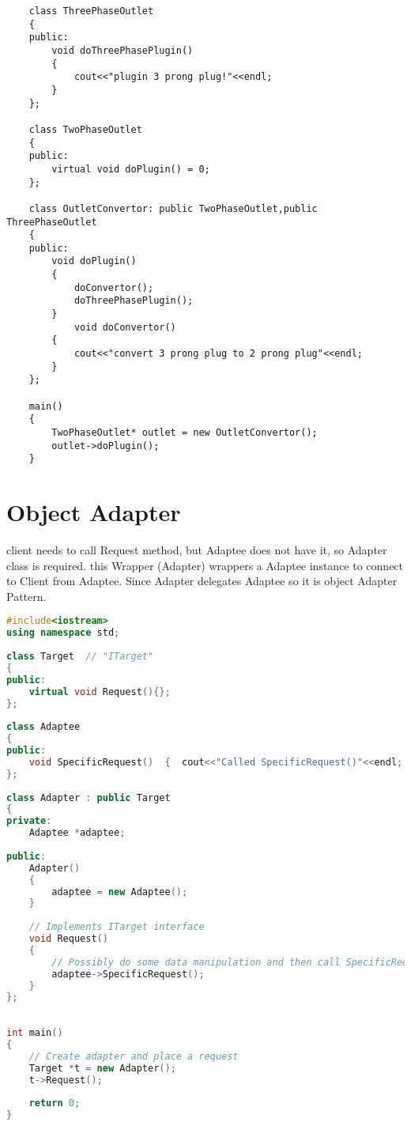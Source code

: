 \documentclass{book}
\begin{document}
\begin{lstlisting}
    class ThreePhaseOutlet  
    {  
    public:  
        void doThreePhasePlugin()  
        {  
            cout<<"plugin 3 prong plug!"<<endl;  
        }  
    };  
    
    class TwoPhaseOutlet   
    {  
    public:  
        virtual void doPlugin() = 0;  
    };  

    class OutletConvertor: public TwoPhaseOutlet,public ThreePhaseOutlet  
    {  
    public:  
        void doPlugin()  
        {  
            doConvertor();  
            doThreePhasePlugin();  
        }     
            void doConvertor()  
        {  
            cout<<"convert 3 prong plug to 2 prong plug"<<endl;  
        }  
    };  

    main() 
    {
        TwoPhaseOutlet* outlet = new OutletConvertor();  
        outlet->doPlugin(); 
    }
\end{lstlisting}

\section{Object Adapter}\label{AdapterPatternObject}

\begin{figure}[H]
\begin{floatrow}
\end{floatrow}
\end{figure}
client needs to call Request method, but Adaptee does not have it, so Adapter class is required.
this Wrapper (Adapter) wrappers a Adaptee instance to connect to Client from Adaptee. Since Adapter delegates Adaptee so it is object Adapter Pattern.

\begin{lstlisting}[caption={Adapter Pattern - diagram example code}, language=C++]
#include<iostream>  
using namespace std;  
  
class Target  // "ITarget"  
{  
public:  
    virtual void Request(){};  
};  
  
class Adaptee  
{  
public:  
    void SpecificRequest()  {  cout<<"Called SpecificRequest()"<<endl;  }  
};  
  
class Adapter : public Target  
{  
private:  
    Adaptee *adaptee;  
  
public:  
    Adapter()  
    {  
        adaptee = new Adaptee();  
    }  
  
    // Implements ITarget interface  
    void Request()  
    {  
        // Possibly do some data manipulation and then call SpecificRequest    
        adaptee->SpecificRequest();  
    }  
};  
  
  
int main()  
{  
    // Create adapter and place a request  
    Target *t = new Adapter();  
    t->Request();  
  
    return 0;  
}  
\end{lstlisting}
\end{document}
